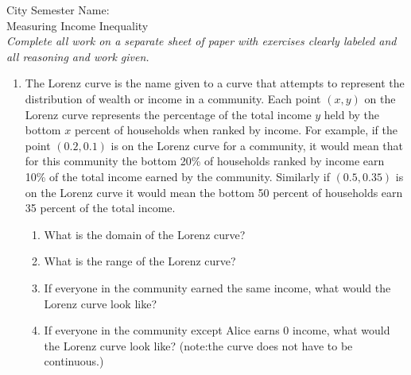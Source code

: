 \documentclass[12pt]{article}
\theoremstyle{plain}     %
\begin{document}
\large
City Semester  \hspace{8cm} Name:\makebox[6cm]{\hrulefill}
\\
Measuring Income Inequality\\
\normalsize 
\emph{Complete all work on a separate sheet of paper with exercises clearly labeled and all reasoning and work given.}\\
\begin{enumerate}
	\item The Lorenz curve is the name given to a curve that attempts to represent the distribution of wealth or income in a community. Each point $(x,y)$ on the Lorenz curve represents the percentage of the total income $y$ held by the bottom $x$ percent of households  when ranked by income. For example, if the point $(0.2,0.1)$ is on the Lorenz curve for a community, it would mean that for this community the bottom 20\% of households ranked by income earn 10\% of the total income earned by the community. Similarly if $(0.5,0.35)$ is on the Lorenz curve it would mean the bottom 50 percent of households earn 35 percent of the total income. 
		\begin{enumerate}
		\item What is the domain of the Lorenz curve?
		\item What is the range of the Lorenz curve?
		\item If everyone in the community earned the same income, what would the Lorenz curve look like?
		\item If everyone in the community except Alice earns 0 income, what would the Lorenz curve look like? (note:the curve does not have to be continuous.)
		

\end{enumerate}
\end{enumerate}
\end{document}
